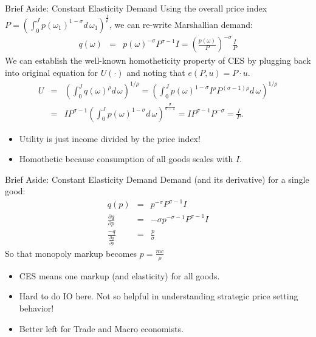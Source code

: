 \documentclass[xcolor=pdftex,dvipsnames,table,mathserif,aspectratio=169]{beamer}
\begin{document}
\begin{frame}{Brief Aside: Constant Elasticity Demand}
Using the overall price index $P =\left( \int_{0}^J  p(\omega_1)^{1-\sigma}  d\, \omega_1 \right)^{\frac{1}{\rho}}$, we can re-write Marshallian demand:
\begin{eqnarray*}
q(\omega) &=& p(\omega)^{-\sigma} P^{\sigma-1} I = \left(\frac{p(\omega)}{P}\right)^{-\sigma}  \frac{I}{P}
\end{eqnarray*}
We can establish the well-known \alert{homotheticity} property of CES by plugging back into original equation for $U(\cdot)$ and noting that $e(P,u) = P \cdot u$.
\begin{eqnarray*}
U &=&\left( \int_0^J q(\omega)^\rho d\, \omega \right)^{1/\rho}  =  \left( \int_0^J  p(\omega)^{1-\sigma} I^{\rho} P^{(\sigma-1) \rho} d\, \omega \right)^{1/\rho} \\
 &=& IP^{\sigma-1}\left( \int_0^J  p(\omega)^{1-\sigma} d\, \omega \right)^{\frac{\sigma}{\sigma-1}}  = IP^{\sigma-1} P^{-\sigma}  = \frac{I}{P}.
\end{eqnarray*}
\begin{itemize}
\item Utility is just income divided by the price index!
\item Homothetic because consumption of all goods scales with $I$.
\end{itemize}
\end{frame}




\begin{frame}{Brief Aside: Constant Elasticity Demand}
Demand (and its derivative) for a single good:
\begin{eqnarray*}
q(p) &=& p^{-\sigma} P^{\sigma-1} I \\
\frac{\partial q}{\partial p} &=& -\sigma p^{-\sigma-1} P^{\sigma-1} I\\
\frac{-q}{\frac{\partial q}{\partial p} } &=& \frac{p}{\sigma}
\end{eqnarray*}
So that monopoly markup becomes $ p = \frac{ mc}{\rho}$
\begin{itemize}
\item CES means one markup (and elasticity) for all goods.
\item Hard to do IO here. Not so helpful in understanding strategic price setting behavior!
\item Better left for Trade and Macro economists.
\end{itemize}
\end{frame}
\end{document}
